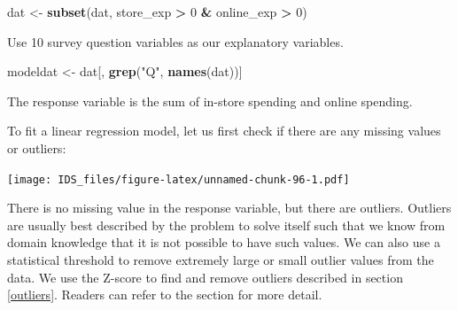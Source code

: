 \documentclass[12pt,]{krantz}
\makeatletter
\newenvironment{Shaded}{\begin{snugshade}}{\end{snugshade}}
\newcommand{\CommentTok}[1]{\textcolor[rgb]{0.37,0.37,0.37}{\textit{#1}}}
\newcommand{\DataTypeTok}[1]{\textcolor[rgb]{0.27,0.27,0.27}{#1}}
\newcommand{\DecValTok}[1]{\textcolor[rgb]{0.06,0.06,0.06}{#1}}
\newcommand{\KeywordTok}[1]{\textcolor[rgb]{0.27,0.27,0.27}{\textbf{#1}}}
\newcommand{\NormalTok}[1]{#1}
\newcommand{\OperatorTok}[1]{\textcolor[rgb]{0.43,0.43,0.43}{\textbf{#1}}}
\newcommand{\StringTok}[1]{\textcolor[rgb]{0.5,0.5,0.5}{#1}}
\newenvironment{kframe}{%
\medskip{}
\setlength{\fboxsep}{.8em}
 \def\at@end@of@kframe{}%
 \ifinner\ifhmode%
  \def\at@end@of@kframe{\end{minipage}}%
  \begin{minipage}{\columnwidth}%
 \fi\fi%
 \def\FrameCommand##1{\hskip\@totalleftmargin \hskip-\fboxsep
 \colorbox{shadecolor}{##1}\hskip-\fboxsep
     \hskip-\linewidth \hskip-\@totalleftmargin \hskip\columnwidth}%
 \MakeFramed {\advance\hsize-\width
   \@totalleftmargin\z@ \linewidth\hsize
   \@setminipage}}%
 {\par\unskip\endMakeFramed%
 \at@end@of@kframe}
\renewenvironment{Shaded}{\begin{kframe}}{\end{kframe}}
\makeatother
\begin{document}
\begin{Shaded}
\begin{Highlighting}[]
\NormalTok{dat <-}\StringTok{ }\KeywordTok{subset}\NormalTok{(dat, store_exp }\OperatorTok{>}\StringTok{ }\DecValTok{0} \OperatorTok{&}\StringTok{ }\NormalTok{online_exp }\OperatorTok{>}\StringTok{ }\DecValTok{0}\NormalTok{)}
\end{Highlighting}
\end{Shaded}

Use 10 survey question variables as our explanatory variables.

\begin{Shaded}
\begin{Highlighting}[]
\NormalTok{modeldat <-}\StringTok{ }\NormalTok{dat[, }\KeywordTok{grep}\NormalTok{(}\StringTok{"Q"}\NormalTok{, }\KeywordTok{names}\NormalTok{(dat))]}
\end{Highlighting}
\end{Shaded}

The response variable is the sum of in-store spending and online spending.

\begin{Shaded}
\end{Shaded}

To fit a linear regression model, let us first check if there are any missing values or outliers:

\begin{Shaded}
\end{Shaded}

\texttt{[image: IDS\_files/figure-latex/unnamed-chunk-96-1.pdf]}

There is no missing value in the response variable, but there are outliers. Outliers are usually best described by the problem to solve itself such that we know from domain knowledge that it is not possible to have such values. We can also use a statistical threshold to remove extremely large or small outlier values from the data. We use the Z-score to find and remove outliers described in section \ref{outliers}. Readers can refer to the section for more detail.
\end{document}
